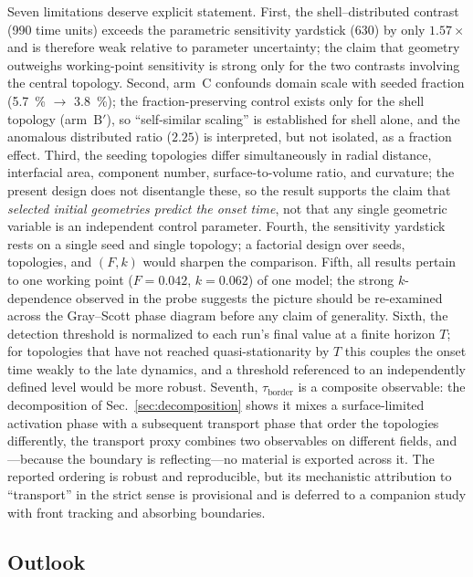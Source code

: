 \documentclass[aps,pre,preprint,superscriptaddress,nofootinbib,floatfix]{revtex4-2}
\newcommand{\tb}{\tau_{\mathrm{border}}}
\begin{document}
Seven limitations deserve explicit statement. First, the shell--distributed contrast (990 time units) exceeds the parametric sensitivity yardstick (630) by only $1.57\times$ and is therefore weak relative to parameter uncertainty; the claim that geometry outweighs working-point sensitivity is strong only for the two contrasts involving the central topology. Second, arm~C confounds domain scale with seeded fraction (\SI{5.7}{\percent} $\to$ \SI{3.8}{\percent}); the fraction-preserving control exists only for the shell topology (arm~$\mathrm{B}'$), so ``self-similar scaling'' is established for shell alone, and the anomalous distributed ratio ($2.25$) is interpreted, but not isolated, as a fraction effect. Third, the seeding topologies differ simultaneously in radial distance, interfacial area, component number, surface-to-volume ratio, and curvature; the present design does not disentangle these, so the result supports the claim that \textit{selected initial geometries predict the onset time}, not that any single geometric variable is an independent control parameter. Fourth, the sensitivity yardstick rests on a single seed and single topology; a factorial design over seeds, topologies, and $(F,k)$ would sharpen the comparison. Fifth, all results pertain to one working point ($F=0.042$, $k=0.062$) of one model; the strong $k$-dependence observed in the probe suggests the picture should be re-examined across the Gray--Scott phase diagram before any claim of generality. Sixth, the detection threshold is normalized to each run's final value at a finite horizon $T$; for topologies that have not reached quasi-stationarity by $T$ this couples the onset time weakly to the late dynamics, and a threshold referenced to an independently defined level would be more robust. Seventh, $\tb$ is a composite observable: the decomposition of Sec.~\ref{sec:decomposition} shows it mixes a surface-limited activation phase with a subsequent transport phase that order the topologies differently, the transport proxy combines two observables on different fields, and---because the boundary is reflecting---no material is exported across it. The reported ordering is robust and reproducible, but its mechanistic attribution to ``transport'' in the strict sense is provisional and is deferred to a companion study with front tracking and absorbing boundaries.

\subsection{Outlook}
\end{document}
